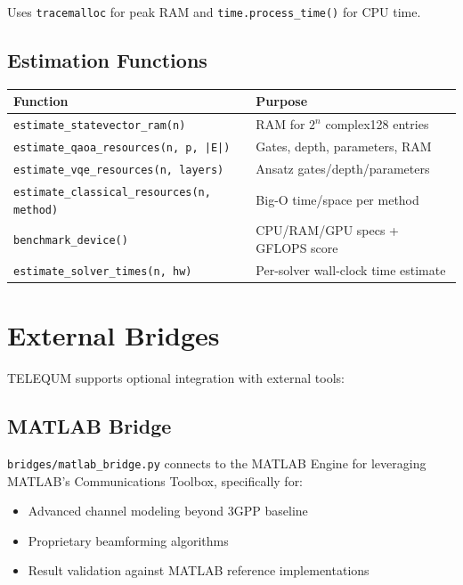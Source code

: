 \documentclass[11pt,a4paper]{article}
\begin{document}
Uses \texttt{tracemalloc} for peak RAM and \texttt{time.process\_time()} for CPU time.

\subsection{Estimation Functions}

\begin{center}
\begin{tabularx}{\textwidth}{lX}
  \toprule
  \textbf{Function} & \textbf{Purpose} \\
  \midrule
  \texttt{estimate\_statevector\_ram(n)} & RAM for $2^n$ complex128 entries \\
  \texttt{estimate\_qaoa\_resources(n, p, |E|)} & Gates, depth, parameters, RAM \\
  \texttt{estimate\_vqe\_resources(n, layers)} & Ansatz gates/depth/parameters \\
  \texttt{estimate\_classical\_resources(n, method)} & Big-O time/space per method \\
  \texttt{benchmark\_device()} & CPU/RAM/GPU specs + GFLOPS score \\
  \texttt{estimate\_solver\_times(n, hw)} & Per-solver wall-clock time estimate \\
  \bottomrule
\end{tabularx}
\end{center}


\section{External Bridges}

TELEQUM supports optional integration with external tools:

\subsection{MATLAB Bridge}

\texttt{bridges/matlab\_bridge.py} connects to the MATLAB Engine for leveraging MATLAB's Communications Toolbox, specifically for:
\begin{itemize}
  \item Advanced channel modeling beyond 3GPP baseline
  \item Proprietary beamforming algorithms
  \item Result validation against MATLAB reference implementations
\end{itemize}
\end{document}
